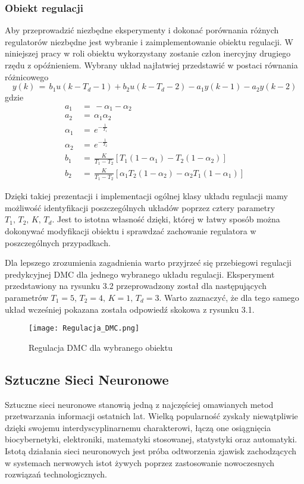 \subsubsection{Obiekt regulacji}
Aby przeprowadzić niezbędne eksperymenty i dokonać porównania różnych regulatorów niezbędne jest wybranie i zaimplementowanie obiektu regulacji. W niniejszej pracy w roli obiektu wykorzystany zostanie człon inercyjny drugiego rzędu z opóźnieniem. Wybrany układ najłatwiej przedstawić w postaci równania różnicowego 
\begin{equation}
y(k) \, = \, b_1u(k-T_d-1) + b_2u(k-T_d-2)-a_1y(k-1)-a_2y(k-2)
\end{equation}
gdzie 
\begin{align*}
a_1 \, &= \, -\alpha_1 -\alpha_2 \\
a_2 \, &= \, \alpha_1\alpha_2 \\
\alpha_1 \, &= \, e^{-\frac{1}{T_1}} \\
\alpha_2 \, &= \, e^{-\frac{1}{T_2}} \\
b_1 \, &= \, \frac{K}{T_1 - T_2}[T_1(1-\alpha_1)-T_2(1-\alpha_2)] \\
b_2 \, &= \, \frac{K}{T_1 - T_2}[\alpha_1 T_2(1-\alpha_2)-\alpha_2 T_1(1-\alpha_1)]
\end{align*}

\par Dzięki takiej prezentacji i implementacji ogólnej klasy układu regulacji mamy możliwość identyfikacji poszczególnych układów poprzez cztery parametry \( T_1, \, T_2, \, K, \, T_d \). Jest to istotna własność dzięki, której w łatwy sposób można dokonywać modyfikacji obiektu i sprawdzać zachowanie regulatora w poszczególnych przypadkach.

\par Dla lepszego zrozumienia zagadnienia warto przyjrzeć się przebiegowi regulacji predykcyjnej DMC dla jednego wybranego układu regulacji. Eksperyment przedstawiony na rysunku 3.2 przeprowadzony został dla następujących parametrów \( T_1=5, \, T_2=4, \, K=1, \, T_d=3 \). Warto zaznaczyć, że dla tego samego układ wcześniej pokazana została odpowiedź skokowa z rysunku 3.1.  
\begin{figure}[!h]
    \label{fig:Regulacja-DMC}
    \centering \texttt{[image: Regulacja\_DMC.png]}
    \caption{Regulacja DMC dla wybranego obiektu}
\end{figure}

\subsection{Sztuczne Sieci Neuronowe}
Sztuczne sieci neuronowe stanowią jedną z najczęściej omawianych metod przetwarzania informacji ostatnich lat. Wielką popularność zyskały niewątpliwie dzięki swojemu interdyscyplinarnemu charakterowi, łączą one osiągnięcia biocybernetyki, elektroniki, matematyki stosowanej, statystyki oraz automatyki. Istotą działania sieci neuronowych jest próba odtworzenia zjawisk zachodzących w systemach nerwowych istot żywych poprzez zastosowanie nowoczesnych rozwiązań technologicznych.

